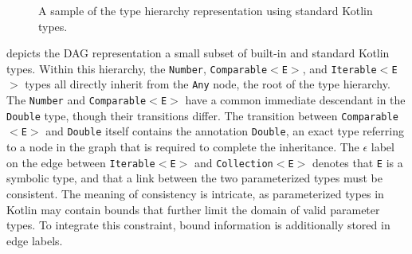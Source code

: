 \begin{figure}
    \footnotesize
    \centering
    \caption{A sample of the type hierarchy representation using standard Kotlin types.}
    \label{fig:type-hierarchy}
\end{figure}

 depicts the \Gls{DAG} representation
a small subset of built-in and standard Kotlin types.
Within this hierarchy, the \texttt{Number}, \texttt{Comparable$<$E$>$}, 
and \texttt{Iterable$<$E$>$} types all directly inherit from the \texttt{Any} node, 
the root of the type hierarchy.
The \texttt{Number} and \texttt{Comparable$<$E$>$} have a common immediate descendant in the 
\texttt{Double} type, though their transitions differ.
The transition between \texttt{Comparable$<$E$>$} and \texttt{Double} itself
contains the annotation \texttt{Double}, an exact type referring to a node in the graph
that is required to complete the inheritance.
The $\epsilon$ label on the edge between \texttt{Iterable$<$E$>$} and \texttt{Collection$<$E$>$}
denotes that \texttt{E} is a symbolic type, and that a link between the two parameterized types
must be consistent.
The meaning of consistency is intricate,
as parameterized types in Kotlin may contain bounds
that further limit the domain of valid parameter types.
To integrate this constraint, bound information is additionally
stored in edge labels.


